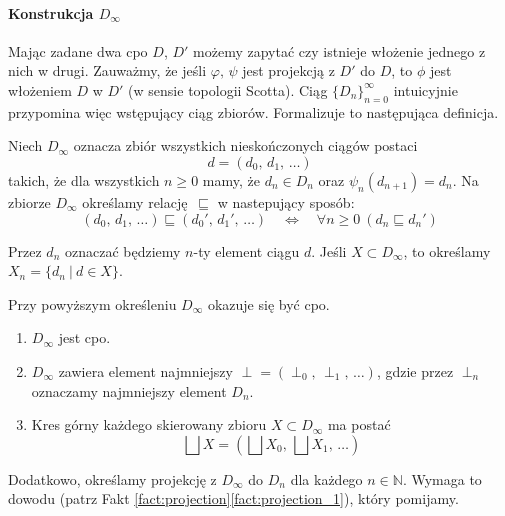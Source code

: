 \paragraph{Konstrukcja \(D_\infty\)}

Mając zadane dwa cpo \(D\), \(D'\) możemy zapytać czy istnieje włożenie jednego z nich w drugi. Zauważmy, że jeśli \(\varphi,\,\psi\) jest projekcją z \(D'\) do \(D\), to \(\phi\) jest włożeniem \(D\) w \(D'\) (w sensie topologii Scotta). Ciąg \(\{D_n\}_{n=0}^\infty\) intuicyjnie przypomina więc wstępujący ciąg zbiorów. Formalizuje to następująca definicja.


\begin{definicja}%
Niech \(D_\infty\) oznacza zbiór wszystkich nieskończonych ciągów postaci
\[
d=(d_0,\,d_1,\,\dots)
\]
takich, że dla wszystkich \(n\geq 0\) mamy, że \(d_n\in D_n\) oraz \(\psi_n (d_{n+1}) = d_n\). 
Na zbiorze \(D_\infty\) określamy relację \(\sqsubseteq\) w nastepujący sposób:
\[
(d_0,\,d_1,\,\dots) \sqsubseteq (d_0',\,d_1',\,\dots) \quad \Leftrightarrow\quad  \forall n\geq 0\  (d_n\sqsubseteq d_n') 
\]

  Przez \(d_n\) oznaczać będziemy \(n\)-ty element ciągu \(d\). Jeśli \(X\subset D_\infty\), to określamy \(X_n=\{ d_n\ |\ d\in X\}\).

\end{definicja}

Przy powyższym określeniu \(D_\infty\) okazuje się być cpo.

\begin{fakt}%
\begin{enumerate}[label={(\roman*)}, ref={(\roman*)}] 
  \setlength\itemsep{0em}
\item \(D_\infty\) jest cpo.
\item \(D_\infty\) zawiera element najmniejszy \(\perp=(\perp_0,\,\perp_1,\,\dots)\), gdzie przez \(\perp_n\) oznaczamy najmniejszy element \(D_n\).
\item Kres górny każdego skierowany zbioru \(X\subset D_\infty\) ma postać
\[
\bigsqcup X = (\bigsqcup X_0,\,\bigsqcup X_1,\,\dots)
\]
\end{enumerate}
\end{fakt}

Dodatkowo, określamy projekcję z \(D_\infty\) do \(D_n\) dla każdego \(n\in\mathbb{N}\).
Wymaga to dowodu (patrz Fakt \ref{fact:projection}\ref{fact:projection_1}), który pomijamy.

